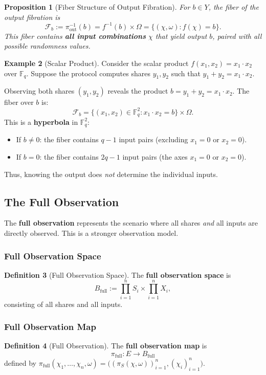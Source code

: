\documentclass[11pt,a4paper]{article}
\theoremstyle{definition}
\newtheorem{definition}{Definition}[section]
\newtheorem{example}[definition]{Example}
\theoremstyle{plain}
\newtheorem{proposition}[definition]{Proposition}
\newcommand{\F}{\mathbb{F}}
\newcommand{\cF}{\mathcal{F}}
\begin{document}
\begin{proposition}[Fiber Structure of Output Fibration]
\label{prop:output-fiber}
For $b \in Y$, the fiber of the output fibration is
\[
\cF_b := \pi_{\mathrm{out}}^{-1}(b) = f^{-1}(b) \times \Omega = \{(\chi, \omega) : f(\chi) = b\}.
\]
This fiber contains \textbf{all input combinations} $\chi$ that yield output $b$, paired with all possible randomness values.
\end{proposition}

\begin{example}[Scalar Product]
Consider the scalar product $f(x_1, x_2) = x_1 \cdot x_2$ over $\F_q$. Suppose the protocol computes shares $y_1, y_2$ such that $y_1 + y_2 = x_1 \cdot x_2$.

Observing both shares $(y_1, y_2)$ reveals the product $b = y_1 + y_2 = x_1 \cdot x_2$. The fiber over $b$ is:
\[
\cF_b = \{(x_1, x_2) \in \F_q^2 : x_1 \cdot x_2 = b\} \times \Omega.
\]
This is a \textbf{hyperbola} in $\F_q^2$:
\begin{itemize}
    \item If $b \neq 0$: the fiber contains $q - 1$ input pairs (excluding $x_1 = 0$ or $x_2 = 0$).
    \item If $b = 0$: the fiber contains $2q - 1$ input pairs (the axes $x_1 = 0$ or $x_2 = 0$).
\end{itemize}
Thus, knowing the output does \emph{not} determine the individual inputs.
\end{example}

\subsection{The Full Observation}

The \textbf{full observation} represents the scenario where all shares \emph{and} all inputs are directly observed. This is a stronger observation model.

\subsubsection{Full Observation Space}
\begin{definition}[Full Observation Space]
The \textbf{full observation space} is
\[
B_{\mathrm{full}} := \prod_{i=1}^n S_i \times \prod_{i=1}^n X_i,
\]
consisting of all shares and all inputs.
\end{definition}

\subsubsection{Full Observation Map}
\begin{definition}[Full Observation]
\label{def:full-fibration}
The \textbf{full observation map} is
\[
\pi_{\mathrm{full}}: E \longrightarrow B_{\mathrm{full}}
\]
defined by $\pi_{\mathrm{full}}(\chi_1, \ldots, \chi_n, \omega) = \bigl( (\pi_S(\chi, \omega))_{i=1}^n, (\chi_i)_{i=1}^n \bigr)$.
\end{definition}
\end{document}
